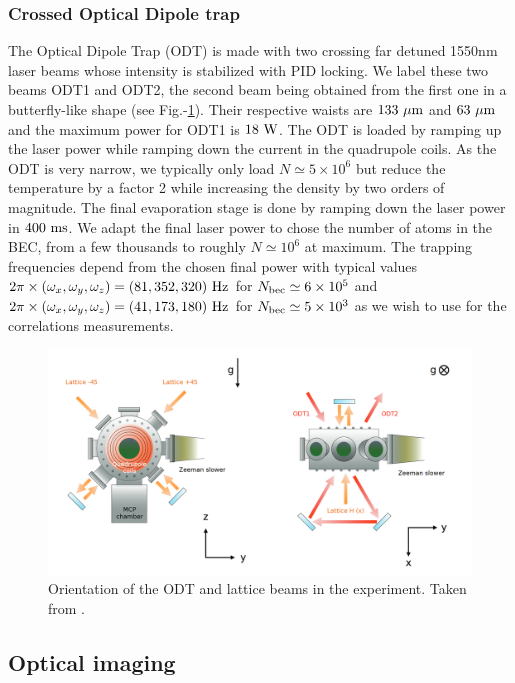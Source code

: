 \subsubsection{Crossed Optical Dipole trap}

The Optical Dipole Trap (ODT) is made with two crossing far detuned 1550nm laser beams whose intensity is stabilized with PID locking. We label these two beams ODT1 and ODT2, the second beam being obtained from the first one in a butterfly-like shape (see Fig.-\ref{fig:scheme_odt_lattice}). Their respective waists are $133 \ \mu \rm{m}$ and $63 \ \mu \rm{m}$ and the maximum power for ODT1 is $18 \ \rm{W}$. The ODT is loaded by ramping up the laser power while ramping down the current in the quadrupole coils. As the ODT is very narrow, we typically only load $N \simeq 5 \times 10^6$ but reduce the temperature by a factor 2 while increasing the density by two orders of magnitude. The final evaporation stage is done by ramping down the laser power in $400 \ \rm{ms}$. We adapt the final laser power to chose the number of atoms in the BEC, from a few thousands to roughly $N \simeq 10^6$ at maximum. The trapping frequencies depend from the chosen final power with typical values $2\pi \times (\omega_x,\omega_y,\omega_z)= (81,352,320) \ \rm{Hz}$ for $N_{\rm{bec}} \simeq 6 \times 10^5$ and $2\pi \times (\omega_x,\omega_y,\omega_z)= (41,173,180) \ \rm{Hz}$ for $N_{\rm{bec}} \simeq 5 \times 10^3$ as we wish to use for the \kmk correlations measurements.


\begin{figure}
    \centering
    \includegraphics[width=\textwidth]{Fig/Chapter3/scheme_odt_lattice.png}
    \caption{Orientation of the ODT and lattice beams in the experiment. Taken from \cite{cayla_these}.}
    \label{fig:scheme_odt_lattice}
\end{figure}

\subsection{Optical imaging}

